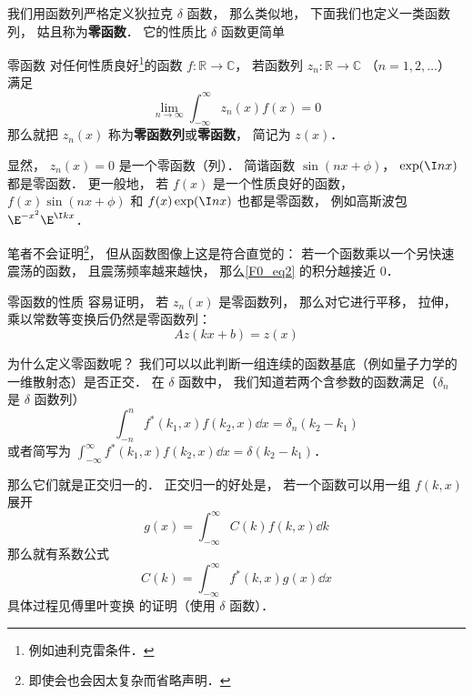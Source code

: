 
我们用函数列严格定义狄拉克 $\delta$ 函数， 那么类似地， 下面我们也定义一类函数列， 姑且称为\textbf{零函数}． 它的性质比 $\delta$ 函数更简单
\begin{definition}{零函数}
对任何性质良好\footnote{例如迪利克雷条件．}的函数 $f: \mathbb R \to \mathbb C$， 若函数列 $z_n: \mathbb R \to \mathbb C$ （$n = 1, 2, \dots$） 满足
\begin{equation}\label{F0_eq2}
\lim_{n\to \infty}\int_{-\infty}^{\infty} z_n(x) f(x) = 0
\end{equation}
那么就把 $z_n(x)$ 称为\textbf{零函数列}或\textbf{零函数}， 简记为 $z(x)$．
\end{definition}

\begin{example}{}
显然， $z_n(x) = 0$ 是一个零函数（列）． 简谐函数 $\sin(nx + \phi)$， $\exp(\I n x)$ 都是零函数． 更一般地， 若 $f(x)$ 是一个性质良好的函数， $f(x)\sin(nx + \phi)$ 和 $f(x)\exp(\I n x)$ 也都是零函数， 例如高斯波包 $\E^{-x^2}\E^{\I kx}$．

笔者不会证明\footnote{即使会也会因太复杂而省略声明．}， 但从函数图像上这是符合直觉的： 若一个函数乘以一个另快速震荡的函数， 且震荡频率越来越快， 那么\autoref{F0_eq2} 的积分越接近 $0$．
\end{example}

\begin{theorem}{零函数的性质}
容易证明， 若 $z_n(x)$ 是零函数列， 那么对它进行平移， 拉伸， 乘以常数等变换后仍然是零函数列：
\begin{equation}
A z(kx + b) = z(x)
\end{equation}
\end{theorem}

为什么定义零函数呢？ 我们可以以此判断一组连续的函数基底（例如量子力学的一维散射态）是否正交． 在 $\delta$ 函数中， 我们知道若两个含参数的函数满足（$\delta_n$ 是 $\delta$ 函数列）
\begin{equation}\label{F0_eq1}
\int_{-n}^{n} f^*(k_1, x) f(k_2, x)\dd{x} = \delta_n(k_2 - k_1)
\end{equation}
或者简写为 $\int_{-\infty}^{\infty} f^*(k_1, x) f(k_2, x)\dd{x} = \delta(k_2 - k_1)$．

那么它们就是正交归一的． 正交归一的好处是， 若一个函数可以用一组 $f(k, x)$ 展开
\begin{equation}
g(x) = \int_{-\infty}^{\infty} C(k) f(k, x) \dd{k}
\end{equation}
那么就有系数公式
\begin{equation}
C(k) = \int_{-\infty}^{\infty} f^*(k, x)g(x)\dd{x}
\end{equation}
具体过程见傅里叶变换 的证明（使用 $\delta$ 函数）．

